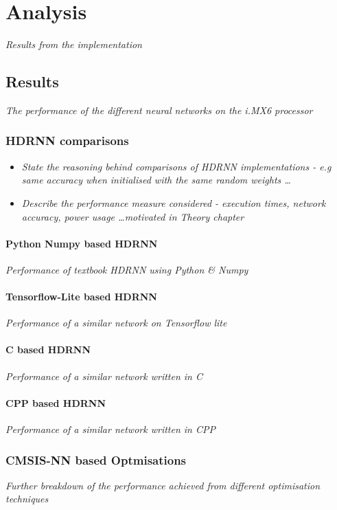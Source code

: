 \part{Analysis}
\textit{Results from the implementation}

\chapter{Results}
\textit{The performance of the different neural networks on the i.MX6 processor}

\section{HDRNN comparisons}
\begin{itemize}
	\item \textit{State the reasoning behind comparisons of HDRNN implementations - e.g same accuracy when initialised with the same random weights \dots}
	\item \textit{Describe the performance measure considered - execution times, network accuracy, power usage \dots motivated in Theory chapter}

\end{itemize}

\subsection[Python - Numpy]{Python Numpy based HDRNN}
\textit{Performance of textbook HDRNN using Python \& Numpy}

\subsection[Tensorflow Lite]{Tensorflow-Lite based HDRNN}
\textit{Performance of a similar network on Tensorflow lite}

\subsection[C]{C based HDRNN}
\textit{Performance of a similar network written in C}

\subsection[CPP - Eigen]{CPP based HDRNN}
\textit{Performance of a similar network written in CPP}

\section{CMSIS-NN based Optmisations}
\textit{Further breakdown of the performance achieved from different optimisation techniques}

